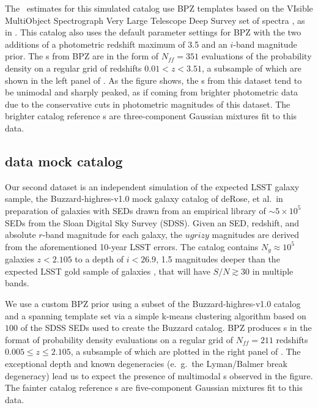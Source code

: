 The \pz\ estimates for this simulated catalog use BPZ templates based on the 
VIsible MultiObject Spectrograph Very Large Telescope Deep Survey set of 
spectra \citep{fevre_vimos_2005}, as in \citet{ilbert_accurate_2006}.
This catalog also uses the default parameter settings for BPZ with the two 
additions of a photometric redshift maximum of 3.5 and an $i$-band magnitude 
prior.
The \pz s from BPZ are in the form of $N_{ff} = 351$ evaluations of the 
probability density on a regular grid of redshifts $0.01 < z < 3.51$, a 
subsample of which are shown in the left panel of .
As the figure shows, the \pz s from this dataset tend to be unimodal and 
sharply peaked, as if coming from brighter photometric data due to the 
conservative cuts in photometric magnitudes of this dataset.
The brighter catalog reference \pz s are three-component Gaussian mixtures fit 
to this data.

\subsection{\Ssdata data mock catalog}

Our second dataset is an independent simulation of the expected LSST galaxy 
sample, the Buzzard-highres-v1.0 mock galaxy catalog of deRose, et al.\ in 
preparation of galaxies with SEDs drawn from an empirical library of 
$\sim5\times10^{5}$ SEDs from the Sloan Digital Sky Survey (SDSS).
Given an SED, redshift, and absolute $r$-band magnitude for each galaxy, the 
$ugrizy$ magnitudes are derived from the aforementioned 10-year LSST errors.
The catalog contains $N_{g} \approx 10^{5}$ galaxies $z<2.105$ to a depth of 
$i<26.9$, 1.5 magnitudes deeper than the expected LSST gold sample of galaxies 
\citep{ScienceBook}, that will have $S/N \gtrsim 30$ in multiple bands.

We use a custom BPZ prior using a subset of the Buzzard-highres-v1.0 catalog 
and a spanning template set via a simple k-means clustering algorithm based on 
$100$ of the SDSS SEDs used to create the Buzzard catalog.
BPZ produces \pz s in the format of probability density evaluations on a 
regular grid of $N_{ff}=211$ redshifts $0.005\leq z\leq2.105$, a subsample of 
which are plotted in the right panel of .
The exceptional depth and known degeneracies (e.~g.~the Lyman/Balmer break 
degeneracy) lead us to expect the presence of multimodal \pz s observed in the 
figure.
The fainter catalog reference \pz s are five-component Gaussian mixtures fit to 
this data.


